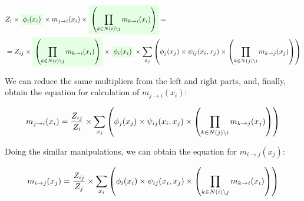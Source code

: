 \documentclass[fleqn,leqno]{article}
\newcommand{\highlight}[1]{\colorbox{green!10}{$\displaystyle#1$}}
\begin{document}
\begin{equation}
\begin{split}
& Z_i \times \highlight{\phi_i(x_i)} \times m_{j \rightarrow i}(x_i) \times \highlight{\left( \prod_{k \in N(i) \setminus j} m_{k \rightarrow i}(x_i) \right)} = \\
& = Z_{ij} \times \highlight{\left( \prod_{k \in N(i) \setminus j} m_{k \rightarrow i}(x_i) \right)} \times \highlight{\phi_i(x_i)} \times \sum_{x_j} \left( \phi_j(x_j) \times \psi_{ij}(x_i, x_j) \times \left( \prod_{k \in N(j) \setminus i} m_{k \rightarrow j}(x_j) \right) \right) 
\end{split}
\end{equation}

We can reduce the same multipliers from the left and right parts, and, finally, obtain the equation for calculation of $m_{j \rightarrow i}(x_i)$:

\begin{equation}
\begin{split}
m_{j \rightarrow i}(x_i) = {Z_{ij} \over Z_i} \times \sum_{x_j} \left( \phi_j(x_j) \times \psi_{ij}(x_i, x_j) \times \left( \prod_{k \in N(j) \setminus i} m_{k \rightarrow j}(x_j) \right) \right) 
\end{split}
\end{equation}

Doing the similar manipulations, we can obtain the equation for $m_{i \rightarrow j}(x_j)$:

\begin{equation}
\begin{split}
m_{i \rightarrow j}(x_j) = {Z_{ij} \over Z_j} \times \sum_{x_i} \left( \phi_i(x_i) \times \psi_{ij}(x_i, x_j) \times \left( \prod_{k \in N(i) \setminus j} m_{k \rightarrow i}(x_i) \right) \right) 
\end{split}
\end{equation}
\end{document}
